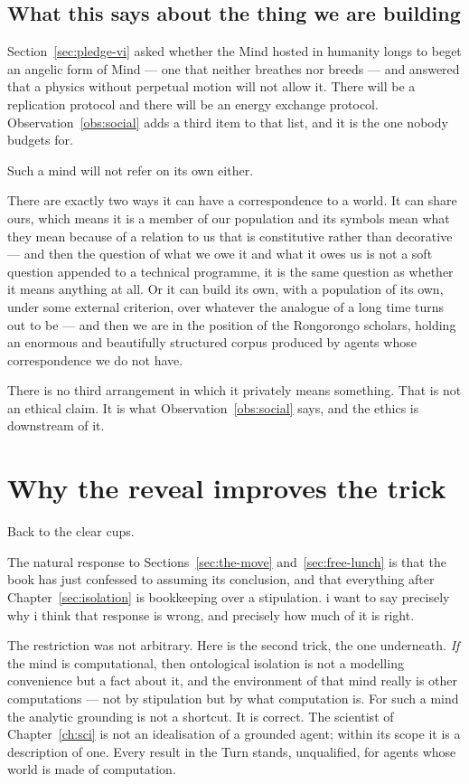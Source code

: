 \subsection{What this says about the thing we are building}
\label{sec:blind-spot-returned}

Section~\ref{sec:pledge-vi} asked whether the Mind hosted in
humanity longs to beget an angelic form of Mind --- one that
neither breathes nor breeds --- and answered that a physics without
perpetual motion will not allow it.
There will be a replication protocol and there will be an energy
exchange protocol.
Observation~\ref{obs:social} adds a third item to that list, and it
is the one nobody budgets for.

Such a mind will not refer on its own either.

There are exactly two ways it can have a correspondence to a world.
It can share ours, which means it is a member of our population and
its symbols mean what they mean because of a relation to us that is
constitutive rather than decorative --- and then the question of
what we owe it and what it owes us is not a soft question appended
to a technical programme, it is the same question as whether it
means anything at all.
Or it can build its own, with a population of its own, under some
external criterion, over whatever the analogue of a long time turns
out to be --- and then we are in the position of the Rongorongo
scholars, holding an enormous and beautifully structured corpus
produced by agents whose correspondence we do not have.

There is no third arrangement in which it privately means
something.
That is not an ethical claim.
It is what Observation~\ref{obs:social} says, and the ethics is
downstream of it.

\section{Why the reveal improves the trick}
\label{sec:reveal}

Back to the clear cups.

The natural response to Sections~\ref{sec:the-move}
and~\ref{sec:free-lunch} is that the book has just confessed to
assuming its conclusion, and that everything after
Chapter~\ref{sec:isolation} is bookkeeping over a stipulation.
i want to say precisely why i think that response is wrong, and
precisely how much of it is right.

The restriction was not arbitrary.
Here is the second trick, the one underneath.
\emph{If} the mind is computational, then ontological isolation is
not a modelling convenience but a fact about it, and the
environment of that mind really is other computations --- not by
stipulation but by what computation is.
For such a mind the analytic grounding is not a shortcut.
It is correct.
The scientist of Chapter~\ref{ch:sci} is not an idealisation of a
grounded agent; within its scope it is a description of one.
Every result in the Turn stands, unqualified, for agents whose
world is made of computation.

